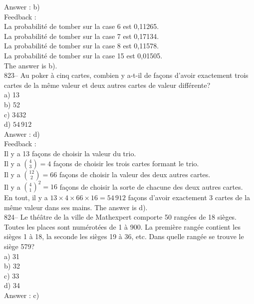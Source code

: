 \documentclass[letterpaper, 12pt]{article}
\begin{document}
Answer : b)\\

Feedback : \\
La probabilit\'e de tomber sur la case 6 est 0,11265.\\
La probabilit\'e de tomber sur la case 7 est 0,17134.\\
La probabilit\'e de tomber sur la case 8 est 0,11578.\\
La probabilit\'e de tomber sur la case 15 est 0,01505.\\
The answer is b).\\

823-- Au poker \`a cinq cartes, combien y a-t-il de fa\c cons d'avoir
exactement trois cartes de la m\^eme valeur et deux autres cartes de valeur
diff\'erente?\\
a) 13\\
b) 52\\
c) 3432\\
d) $54\,912$\\

Answer : d)\\

Feedback : \\
Il y a 13 fa\c cons de choisir la valeur du trio.\\ [2mm] Il y a
$\binom{4}{3}=4$ fa\c cons de choisir les trois cartes formant le
trio.\\ [2mm] Il y a $\binom{12}{2}=66$ fa\c cons de choisir la
valeur des deux autres cartes.\\ [2mm] Il y a $\binom{4}{1}^{2}=16$
fa\c cons de choisir la sorte de chacune des deux autres cartes.\\
[2mm]
En tout, il y a $13\times4\times66\times16=54\,912$ fa\c cons d'avoir
exactement 3 cartes de la m\^eme valeur dans ses mains.  The answer is
d).\\

824-- Le th\'e\^atre de la ville de Mathexpert comporte 50 rang\'ees de 18
si\`eges.  Toutes  les places sont num\'erot\'ees de 1 \`a 900.  La
premi\`ere rang\'ee contient les si\`eges 1 \`a 18, la seconde les si\`eges
19 \`a 36, etc.  Dans quelle rang\'ee se trouve le si\`ege 579?\\
a) 31\\
b) 32\\
c) 33\\
d) 34\\

Answer : c) \\
\end{document}
